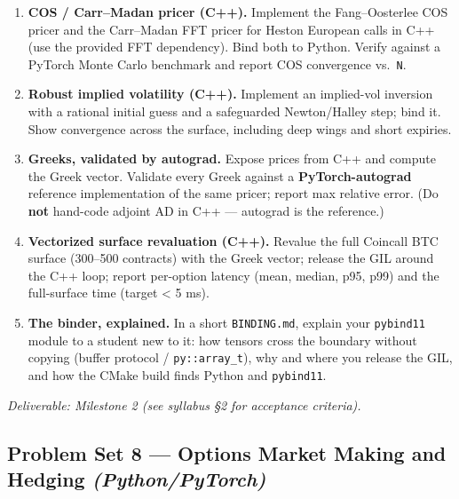 \documentclass[
]{article}
\providecommand{\tightlist}{%
  \setlength{\itemsep}{0pt}\setlength{\parskip}{0pt}}
\begin{document}
\begin{enumerate}
\def\labelenumi{\arabic{enumi}.}
\tightlist
\item
  \textbf{COS / Carr--Madan pricer (C++).} Implement the Fang--Oosterlee
  COS pricer and the Carr--Madan FFT pricer for Heston European calls in
  C++ (use the provided FFT dependency). Bind both to Python. Verify
  against a PyTorch Monte Carlo benchmark and report COS convergence
  vs.~\texttt{N}.
\item
  \textbf{Robust implied volatility (C++).} Implement an implied-vol
  inversion with a rational initial guess and a safeguarded
  Newton/Halley step; bind it. Show convergence across the surface,
  including deep wings and short expiries.
\item
  \textbf{Greeks, validated by autograd.} Expose prices from C++ and
  compute the Greek vector. Validate every Greek against a
  \textbf{PyTorch-autograd} reference implementation of the same pricer;
  report max relative error. (Do \textbf{not} hand-code adjoint AD in
  C++ --- autograd is the reference.)
\item
  \textbf{Vectorized surface revaluation (C++).} Revalue the full
  Coincall BTC surface (300--500 contracts) with the Greek vector;
  release the GIL around the C++ loop; report per-option latency (mean,
  median, p95, p99) and the full-surface time (target \textless{} 5 ms).
\item
  \textbf{The binder, explained.} In a short \texttt{BINDING.md},
  explain your \texttt{pybind11} module to a student new to it: how
  tensors cross the boundary without copying (buffer protocol /
  \texttt{py::array\_t}), why and where you release the GIL, and how the
  CMake build finds Python and \texttt{pybind11}.
\end{enumerate}

\emph{Deliverable: Milestone 2 (see syllabus §2 for acceptance
criteria).}

\subsection{\texorpdfstring{Problem Set 8 --- Options Market Making and
Hedging
\emph{(Python/PyTorch)}}{Problem Set 8 --- Options Market Making and Hedging (Python/PyTorch)}}\label{problem-set-8-options-market-making-and-hedging-pythonpytorch}
\end{document}
